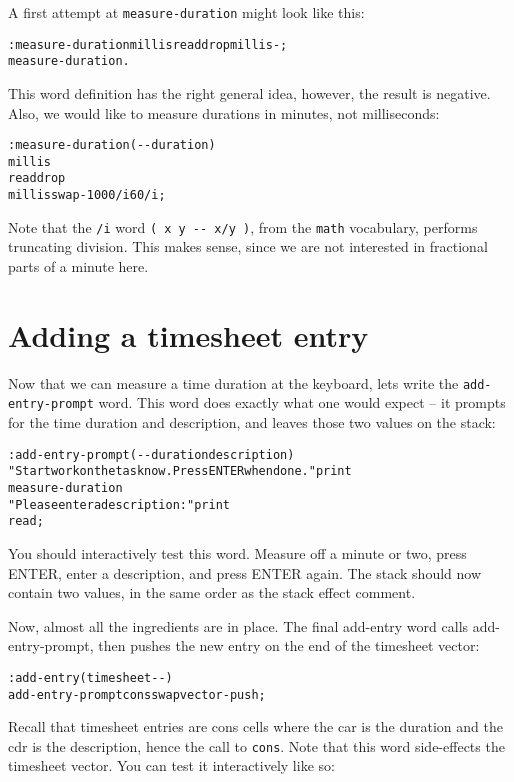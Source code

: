 \documentclass[english]{book}
\begin{document}
A first attempt at \texttt{measure-duration} might look like this:

\begin{alltt}
: measure-duration millis read drop millis - ;
measure-duration .
\end{alltt}

This word definition has the right general idea, however, the result
is negative. Also, we would like to measure durations in minutes,
not milliseconds:

\begin{alltt}
: measure-duration ( -{}- duration )
    millis
    read drop
    millis swap - 1000 /i 60 /i ;
\end{alltt}

Note that the \texttt{/i} word \texttt{( x y -{}- x/y )}, from the
\texttt{math} vocabulary, performs truncating division. This
makes sense, since we are not interested in fractional parts of a
minute here.

\section{Adding a timesheet entry}

Now that we can measure a time duration at the keyboard, lets write
the \texttt{add-entry-prompt} word. This word does exactly what one
would expect -- it prompts for the time duration and description,
and leaves those two values on the stack:

\begin{alltt}
: add-entry-prompt ( -{}- duration description )
    "Start work on the task now. Press ENTER when done." print
    measure-duration
    "Please enter a description:" print
    read ;
\end{alltt}

You should interactively test this word. Measure off a minute or two,
press ENTER, enter a description, and press ENTER again. The stack
should now contain two values, in the same order as the stack effect
comment.

Now, almost all the ingredients are in place. The final add-entry
word calls add-entry-prompt, then pushes the new entry on the end
of the timesheet vector:

\begin{alltt}
: add-entry ( timesheet -{}- )
    add-entry-prompt cons swap vector-push ;
\end{alltt}

Recall that timesheet entries are cons cells where the car is the
duration and the cdr is the description, hence the call to \texttt{cons}.
Note that this word side-effects the timesheet vector. You can test
it interactively like so:
\end{document}
